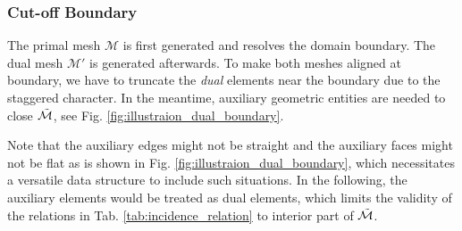 \documentclass{article}
\begin{document}
\subsubsection{Cut-off Boundary}
The primal mesh $\mathcal{M}$ is first generated and resolves the domain boundary. The dual mesh $\mathcal{M}'$ is generated afterwards. To make both meshes aligned at boundary, we have to truncate the \emph{dual} elements near the boundary due to the staggered character. In the meantime, auxiliary geometric entities are needed to close $\Tilde{\mathcal{M}}$, see Fig. \ref{fig:illustraion_dual_boundary}.

Note that the auxiliary edges might not be straight and the auxiliary faces might not be flat as is shown in Fig. \ref{fig:illustraion_dual_boundary}, which necessitates a versatile data structure to include such situations. In the following, the auxiliary elements would be treated as dual elements, which limits the validity of the relations in Tab. \ref{tab:incidence_relation} to interior part of $\Tilde{\mathcal{M}}$.
\end{document}
